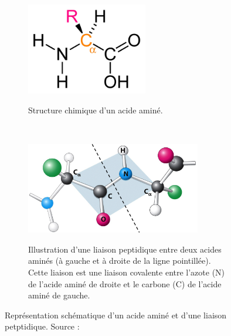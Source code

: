 	\begin{figure}[H]
		\begin{subfigure}{.4\textwidth}
			\centering
			{\includegraphics[height=4cm]{./figures/ch1/amino_acid_structure}}
			\caption{Structure chimique d'un acide aminé.}
			\label{fig:amino_acid_structure}
		\end{subfigure}
		~
		\begin{subfigure}{.6\textwidth}
			\centering
			{\includegraphics[height=4cm]{./figures/ch1/peptidic_bond.png}}
			\caption{Illustration d'une liaison peptidique entre deux acides aminés (à gauche et à droite de la ligne pointillée). Cette liaison est une liaison covalente entre l'azote (N) de l'acide aminé de droite et le carbone (C) de l'acide aminé de gauche.}
			\label{fig:peptide_bond}
		\end{subfigure}
		\caption[Acide aminé.]{Représentation schématique d'un acide aminé et d'une liaison petptidique. Source :~\cite{berg_biochemistry_2012}}
		\label{fig:aminoAcid}
	\end{figure}
	
